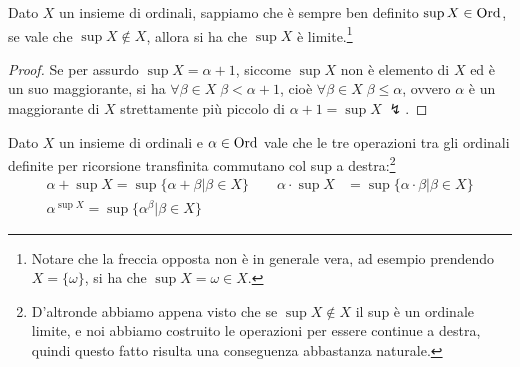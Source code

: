 \begin{remark}
	Dato $X$ un insieme di ordinali, sappiamo che \`e sempre ben definito $\sup X \in \operatorname{Ord}$, se vale che $\sup X \not \in X$, allora  si ha che $\sup X$ \`e limite.\footnote{Notare che la freccia opposta
	non \`e in generale vera, ad esempio prendendo $X = \{\omega\}$, si ha che $\sup X = \omega \in X$.}
\end{remark}

\begin{proof}
	Se per assurdo $\sup X = \alpha + 1$, siccome $\sup X$ non \`e elemento di $X$ ed \`e un suo maggiorante, si ha $\forall \beta \in X \; \beta < \alpha + 1$,
	cio\`e $\forall \beta \in X \; \beta \leq \alpha$, ovvero $\alpha$ \`e un maggiorante di $X$ strettamente pi\`u piccolo di $\alpha + 1 = \sup X \; \lightning$.
\end{proof}

\begin{remark}
	Dato $X$ un insieme di ordinali e $\alpha \in \operatorname{Ord}$ vale che le tre operazioni tra gli ordinali definite per ricorsione transfinita
	commutano col sup a destra:\footnote{D'altronde abbiamo appena visto che se $\sup X \not \in X$ il sup \`e un ordinale limite, e noi abbiamo costruito le operazioni per essere continue a destra, quindi questo fatto risulta una conseguenza abbastanza naturale.}
	\begin{align*}
		\alpha + \sup X = \sup\{\alpha + \beta | \beta \in X\} \qquad \alpha \cdot \sup X &= \sup \{\alpha \cdot \beta | \beta \in X\} \\
		\alpha^{\sup X} = \sup\{\alpha^\beta | \beta \in X\}
	\end{align*}
\end{remark}

